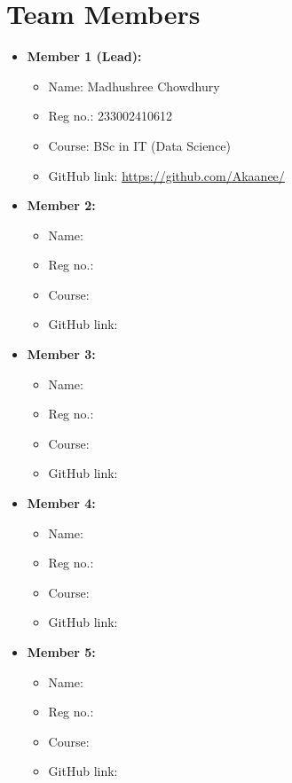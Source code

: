 \documentclass[a4paper,12pt]{report}
\begin{document}
\section*{Team Members}
\begin{itemize}
    \item \textbf{Member 1 (Lead):} 
    \begin{itemize}
        \item Name: Madhushree Chowdhury
        \item Reg no.: 233002410612
        \item Course: BSc in IT (Data Science)
        \item GitHub link: \url{https://github.com/Akaanee/}
    \end{itemize}

    \item \textbf{Member 2:} 
    \begin{itemize}
        \item Name: 
        \item Reg no.: 
        \item Course: 
        \item GitHub link: \url{}
    \end{itemize}

    \item \textbf{Member 3:} 
    \begin{itemize}
        \item Name: 
        \item Reg no.: 
        \item Course: 
        \item GitHub link: \url{}
    \end{itemize}

    \item \textbf{Member 4:} 
    \begin{itemize}
        \item Name: 
        \item Reg no.: 
        \item Course: 
        \item GitHub link: \url{}
    \end{itemize}

    \item \textbf{Member 5:} 
    \begin{itemize}
        \item Name: 
        \item Reg no.: 
        \item Course: 
        \item GitHub link: \url{}
    \end{itemize}
\end{itemize}

\newpage %
\tableofcontents %

\newpage %
\end{document}
